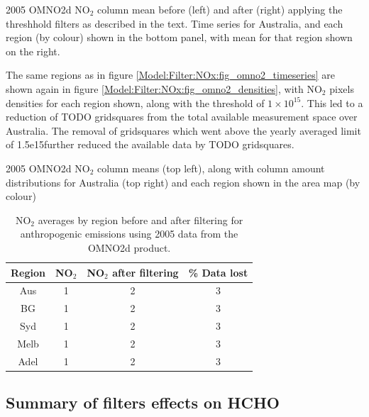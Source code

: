     {2005 OMNO2d NO$_2$ column mean before (left) and after (right) applying the threshhold filters as described in the text. Time series for Australia, and each region (by colour) shown in the bottom panel, with mean for that region shown on the right.}
    {\label{Model:Filter:NOx:fig_omno2_threshaffect}}
    
    The same regions as in figure \ref{Model:Filter:NOx:fig_omno2_timeseries} are shown again in figure \ref{Model:Filter:NOx:fig_omno2_densities}, with NO$_2$ pixels densities for each region shown, along with the threshold of $1 \times 10^{15}$\moleccm.
    This led to a reduction of TODO gridsquares from the total available measurement space over Australia.
    The removal of gridsquares which went above the yearly averaged limit of 1.5e15\moleccm further reduced the available data by TODO gridsquares.
    
    {2005 OMNO2d NO$_2$ column means (top left), along with column amount distributions for Australia (top right) and each region shown in the area map (by colour)}
    {\label{Model:Filter:NOx:fig_omno2_densities}}
    
    \begin{table}
      \caption{NO$_2$ averages by region before and after filtering for anthropogenic emissions using 2005 data from the OMNO2d product.}
      \begin{tabular}{ c c c c }
        \hline
        \textbf{Region} & \textbf{NO$_2$} & \textbf{NO$_2$ after filtering} & \textbf{\% Data lost} 
        \\ \hline
        Aus & 1 & 2 & 3 \\
        BG & 1 & 2 & 3 \\
        Syd & 1 & 2 & 3 \\
        Melb & 1 & 2 & 3 \\
        Adel & 1 & 2 & 3 \\
        \hline
      \end{tabular}
      \label{Model:Filter:NOx:tab_summary}
    \end{table}
    
    
    \subsection{Summary of filters effects on HCHO}
      
